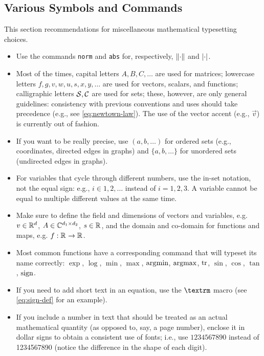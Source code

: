 \documentclass[letterpaper, 10 pt, conference]{ieeeconf}
\begin{document}
\subsection{Various Symbols and Commands}
This section recommendations for miscellaneous mathematical typesetting choices.
\begin{itemize}
\item Use the commands \texttt{norm} and \texttt{abs} for, respectively, $\lVert\cdot\rVert$ and $\lvert\cdot\rvert$.
\item Most of the times, capital letters $A,B,C,\ldots$ are used for matrices; lowercase letters $f,g,v,w,u,s,x,y,\ldots$ are used for vectors, scalars, and functions; calligraphic letters $\mathcal{S},\mathcal{C}$ are used for sets; these, however, are only general guidelines: consistency with previous conventions and uses should take precedence (e.g., see \ref{eq:newtown-law}). The use of the vector accent (e.g., $\vec{v}$) is currently out of fashion.
\item If you want to be really precise, use $(a,b,\ldots)$ for ordered sets (e.g., coordinates, directed edges in graphs) and $\{a,b,\ldots\}$ for unordered sets (undirected edges in graphs).
\item For variables that cycle through different numbers, use the in-set notation, not the equal sign: e.g., $i\in{1,2,\ldots}$ instead of $i=1,2,3$. A variable cannot be equal to multiple different values at the same time.
\item Make sure to define the field and dimensions of vectors and variables, e.g. $v\in\mathbb{R}^{d}{}$, $A\in\mathbb{C}^{d_1\times d_2}{}$, $s\in\mathbb{R}^{}{}$, and the domain and co-domain for functions and maps, e.g. $f:\mathbb{R}^{}{}\to\mathbb{R}^{}{}$.
\item Most common functions have a corresponding command that will typeset its name correctly: $\exp$, $\log$, $\min$, $\max$, $\operatorname*{\arg\!\min}$, $\operatorname*{\arg\!\max}$, $\operatorname{tr}$, $\sin$, $\cos$, $\tan$, $\operatorname{sign}$.
\item If you need to add short text in an equation, use the $\verb|\textrm|$ macro (see \eqref{eq:sign-def} for an example).
\item If you include a number in text that should be treated as an actual mathematical quantity (as opposed to, say, a page number), enclose it in dollar signs to obtain a consistent use of fonts; i.e., use $1234567890$ instead of 1234567890 (notice the difference in the shape of each digit).
\end{itemize}
\end{document}
